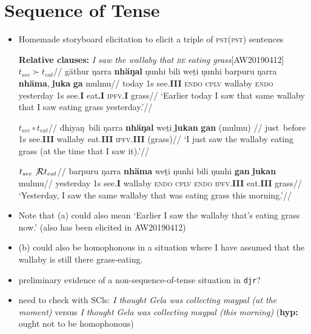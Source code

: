 \documentclass[11pt]{article}
\begin{document}
\section{Sequence of Tense}
\begin{itemize}
	\item Homemade storyboard elicitation to elicit a triple of \textsc{pst(pst)} sentences

\pex \textbf{Relative clauses:} \textit{I saw the wallaby that \textsc{be} eating grass}\hfill{[AW20190412]}
\a\begingl\glpreamble $ t_{see}\succ t_{eat} $//
\gla gäthur ŋarra \textbf{nhäŋal} ŋunhi bili weṯi ŋunhi barpuru ŋarra \textbf{nhäma}, \textbf{ḻuka} \textbf{ga} mulmu//
\glb today 1s see.\textbf{III} \textsc{endo} \textsc{cplv} wallaby \textsc{endo} yesterday 1s see.\textbf{I} eat\textbf{.I} \textsc{ipfv}.\textbf{I} grass//
\glft`Earlier today I saw that same wallaby that I saw eating grass yesterday.'\trailingcitation{[AW20190415]}//
\endgl

\a\begingl\glpreamble $ t_{see}\circ t_{eat} $//
\gla dhiyaŋ~bili ŋarra \textbf{nhäŋal} weṯi \textbf{ḻukan} \textbf{gan} (mulmu) //
\glb  just~before 1s see.\textbf{III} wallaby eat.\textbf{III} \textsc{ipfv}.\textbf{III} (grass)//
\glft`I just saw the wallaby eating grass (at the time that I saw it).'\trailingcitation{[AW20190415]}//
\endgl


\a\begingl\glpreamble $ t_{see}\not\mathcal R t_{eat} $//
\gla barpuru ŋarra \textbf{nhäma} weṯi ŋunhi bili ŋunhi \textbf{gan} \textbf{ḻukan} mulmu//
\glb  yesterday 1s see.\textbf{I} wallaby \textsc{endo} \textsc{cplv} \textsc{endo} \textsc{ipfv}.\textbf{III} eat.\textbf{III} grass//
\glft`Yesterday, I saw the same wallaby that was eating grass this morning.'\trailingcitation{[AW20190422~110']}//\endgl

\xe
\item Note that (a) could also mean `Earlier I saw the wallaby that's eating grass now.' (also has been elicited in AW20190412)
\item (b) could also be homophonous in a situation where I have assumed that the wallaby is still there grass-eating.
\item preliminary evidence of a non-sequence-of-tense situation in \texttt{djr}?
\item need to check with SCls:\textit{ I thought Gela was collecting maypal (at the moment)} versus
\textit{I thought Gela was collecting maypal (this morning)} (\textbf{hyp:} ought not to be homophonous)
\end{itemize}
\end{document}
